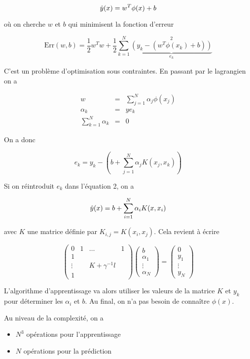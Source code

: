 $$\hat{y}(x) = w^T \phi(x) + b$$

où on cherche $w$ et $b$ qui minimisent la fonction d'erreur

$$\text{Err}(w, b) = \frac{1}{2} w^T w + \frac{1}{2} \sum_{k = 1}^N \underbrace{(y_k - (w^T \phi(x_k) + b))}_{e_k}^2$$

C'est un problème d'optimisation sous contraintes. En passant par le lagrangien on a

\begin{eqnarray*}
w & = & \sum_{j = 1}^N \alpha_j \phi(x_j) \\
\alpha_k & = & y e_k \\
\sum_{k = 1}^N \alpha_k & = & 0
\end{eqnarray*}

On a donc

$$e_k = y_k - (b + \sum_{j = 1}^N \alpha_j K(x_j, x_k))$$

Si on réintroduit $e_k$ dans l'équation 2, on a

$$\hat{y}(x) = b + \sum_{i = 1}^N \alpha_i K(x, x_i)$$

avec $K$ une matrice définie par $K_{i, j} = K(x_i, x_j)$. Cela revient à écrire

$$\begin{pmatrix}
0 & 1 & \dots & 1 \\ 
1 &   &   &   \\ 
\vdots &   & K + \gamma^{-1}l &   \\ 
1 &   &   &  
\end{pmatrix} \begin{pmatrix}
b \\ 
\alpha_1 \\ 
\vdots \\ 
\alpha_N
\end{pmatrix} = \begin{pmatrix}
0 \\ 
y_1 \\ 
\vdots \\ 
y_N
\end{pmatrix} $$


L'algorithme d'apprentissage va alors utiliser les valeurs de la matrice $K$ et $y_k$ pour déterminer les $\alpha_i$ et $b$. Au final, on n'a pas besoin de connaître $\phi(x)$.

Au niveau de la complexité, on a 

\begin{itemize}
	\item $N^3$ opérations pour l'apprentissage
	\item $N$ opérations pour la prédiction
\end{itemize}

